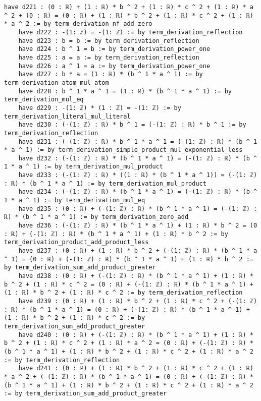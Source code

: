 \documentclass{article}
\begin{document}
\begin{tcolorbox}[colback=white!10, width=\linewidth]
\begin{lstlisting}[language=Lean4]
    have d221 : (0 : ℝ) + (1 : ℝ) * b ^ 2 + (1 : ℝ) * c ^ 2 + (1 : ℝ) * a ^ 2 + (0 : ℝ) = (0 : ℝ) + (1 : ℝ) * b ^ 2 + (1 : ℝ) * c ^ 2 + (1 : ℝ) * a ^ 2 := by term_derivation_nf_add_zero
    have d222 : -(1: ℤ) = -(1: ℤ) := by term_derivation_reflection
    have d223 : b = b := by term_derivation_reflection
    have d224 : b ^ 1 = b := by term_derivation_power_one
    have d225 : a = a := by term_derivation_reflection
    have d226 : a ^ 1 = a := by term_derivation_power_one
    have d227 : b * a = (1 : ℝ) * (b ^ 1 * a ^ 1) := by term_derivation_atom_mul_atom
    have d228 : b ^ 1 * a ^ 1 = (1 : ℝ) * (b ^ 1 * a ^ 1) := by term_derivation_mul_eq
    have d229 : -(1: ℤ) * (1 : ℤ) = -(1: ℤ) := by term_derivation_literal_mul_literal
    have d230 : (-(1: ℤ) : ℝ) * b ^ 1 = (-(1: ℤ) : ℝ) * b ^ 1 := by term_derivation_reflection
    have d231 : (-(1: ℤ) : ℝ) * b ^ 1 * a ^ 1 = (-(1: ℤ) : ℝ) * (b ^ 1 * a ^ 1) := by term_derivation_simple_product_mul_exponential_less
    have d232 : (-(1: ℤ) : ℝ) * (b ^ 1 * a ^ 1) = (-(1: ℤ) : ℝ) * (b ^ 1 * a ^ 1) := by term_derivation_mul_product
    have d233 : (-(1: ℤ) : ℝ) * ((1 : ℝ) * (b ^ 1 * a ^ 1)) = (-(1: ℤ) : ℝ) * (b ^ 1 * a ^ 1) := by term_derivation_mul_product
    have d234 : (-(1: ℤ) : ℝ) * (b ^ 1 * a ^ 1) = (-(1: ℤ) : ℝ) * (b ^ 1 * a ^ 1) := by term_derivation_mul_eq
    have d235 : (0 : ℝ) + (-(1: ℤ) : ℝ) * (b ^ 1 * a ^ 1) = (-(1: ℤ) : ℝ) * (b ^ 1 * a ^ 1) := by term_derivation_zero_add
    have d236 : (-(1: ℤ) : ℝ) * (b ^ 1 * a ^ 1) + (1 : ℝ) * b ^ 2 = (0 : ℝ) + (-(1: ℤ) : ℝ) * (b ^ 1 * a ^ 1) + (1 : ℝ) * b ^ 2 := by term_derivation_product_add_product_less
    have d237 : (0 : ℝ) + (1 : ℝ) * b ^ 2 + (-(1: ℤ) : ℝ) * (b ^ 1 * a ^ 1) = (0 : ℝ) + (-(1: ℤ) : ℝ) * (b ^ 1 * a ^ 1) + (1 : ℝ) * b ^ 2 := by term_derivation_sum_add_product_greater
    have d238 : (0 : ℝ) + (-(1: ℤ) : ℝ) * (b ^ 1 * a ^ 1) + (1 : ℝ) * b ^ 2 + (1 : ℝ) * c ^ 2 = (0 : ℝ) + (-(1: ℤ) : ℝ) * (b ^ 1 * a ^ 1) + (1 : ℝ) * b ^ 2 + (1 : ℝ) * c ^ 2 := by term_derivation_reflection
    have d239 : (0 : ℝ) + (1 : ℝ) * b ^ 2 + (1 : ℝ) * c ^ 2 + (-(1: ℤ) : ℝ) * (b ^ 1 * a ^ 1) = (0 : ℝ) + (-(1: ℤ) : ℝ) * (b ^ 1 * a ^ 1) + (1 : ℝ) * b ^ 2 + (1 : ℝ) * c ^ 2 := by term_derivation_sum_add_product_greater
    have d240 : (0 : ℝ) + (-(1: ℤ) : ℝ) * (b ^ 1 * a ^ 1) + (1 : ℝ) * b ^ 2 + (1 : ℝ) * c ^ 2 + (1 : ℝ) * a ^ 2 = (0 : ℝ) + (-(1: ℤ) : ℝ) * (b ^ 1 * a ^ 1) + (1 : ℝ) * b ^ 2 + (1 : ℝ) * c ^ 2 + (1 : ℝ) * a ^ 2 := by term_derivation_reflection
    have d241 : (0 : ℝ) + (1 : ℝ) * b ^ 2 + (1 : ℝ) * c ^ 2 + (1 : ℝ) * a ^ 2 + (-(1: ℤ) : ℝ) * (b ^ 1 * a ^ 1) = (0 : ℝ) + (-(1: ℤ) : ℝ) * (b ^ 1 * a ^ 1) + (1 : ℝ) * b ^ 2 + (1 : ℝ) * c ^ 2 + (1 : ℝ) * a ^ 2 := by term_derivation_sum_add_product_greater

\end{lstlisting}
\end{tcolorbox}
\end{document}
